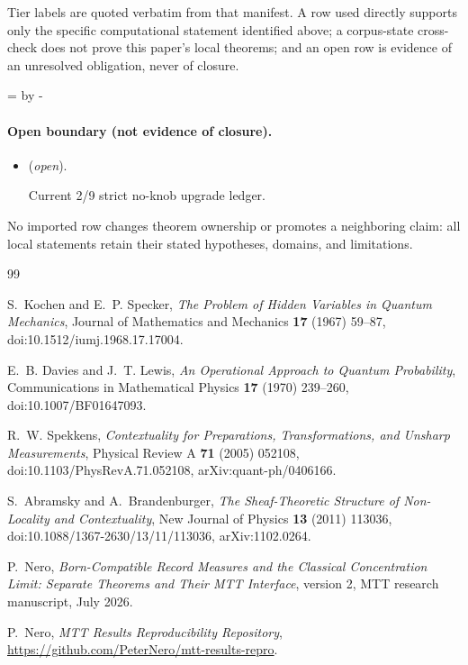 \documentclass[11pt]{article}
\begin{document}
Tier labels are quoted verbatim from that manifest. A row used directly supports only the specific computational statement identified above; a corpus-state cross-check does not prove this paper's local theorems; and an open row is evidence of an unresolved obligation, never of closure.

\par\begingroup{}=\pagegoal\advance{} by -\pagetotal\ifdim\dimen0<7\baselineskip\newpage\fi\endgroup
\paragraph{Open boundary (not evidence of closure).}
\begin{itemize}
\setlength{\itemsep}{0.25em}
\item {} (\emph{open}).\par Current 2/9 strict no-knob upgrade ledger.
\end{itemize}

No imported row changes theorem ownership or promotes a neighboring claim: all local statements retain their stated hypotheses, domains, and limitations.

\begin{thebibliography}{99}

S.~Kochen and E.~P. Specker,
\emph{The Problem of Hidden Variables in Quantum Mechanics},
Journal of Mathematics and Mechanics \textbf{17} (1967) 59--87,
doi:10.1512/iumj.1968.17.17004.

E.~B. Davies and J.~T. Lewis,
\emph{An Operational Approach to Quantum Probability},
Communications in Mathematical Physics \textbf{17} (1970) 239--260,
doi:10.1007/BF01647093.

R.~W. Spekkens,
\emph{Contextuality for Preparations, Transformations, and Unsharp
Measurements},
Physical Review A \textbf{71} (2005) 052108,
doi:10.1103/PhysRevA.71.052108,
arXiv:quant-ph/0406166.

S.~Abramsky and A.~Brandenburger,
\emph{The Sheaf-Theoretic Structure of Non-Locality and Contextuality},
New Journal of Physics \textbf{13} (2011) 113036,
doi:10.1088/1367-2630/13/11/113036,
arXiv:1102.0264.

P.~Nero,
\emph{Born-Compatible Record Measures and the Classical Concentration Limit:
Separate Theorems and Their MTT Interface},
version 2, MTT research manuscript, July 2026.

P.~Nero,
\emph{MTT Results Reproducibility Repository},
\url{https://github.com/PeterNero/mtt-results-repro}.

\end{thebibliography}
\end{document}
